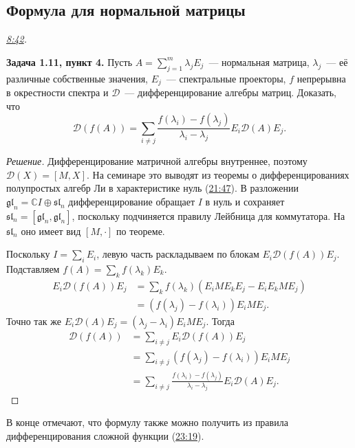 \documentclass[11pt,a4paper]{article}
\theoremstyle{plain}
\theoremstyle{definition}
\newcommand{\CC}{\mathbb C}
\newcommand{\id}{I}
\newcommand{\at}[3]{\href{https://www.youtube.com/watch?v=#1&t=#2s}{#3}}
\newcommand{\topic}[2]{\Needspace{5\baselineskip}\subsection*{#1}\noindent\emph{#2.}\par\nobreak\smallskip}
\begin{document}
\topic{Формула для нормальной матрицы}{\at{RgVedijsA-I}{522}{8:42}}
\noindent\textbf{Задача 1.11, пункт 4.}
Пусть $A=\sum_{j=1}^m\lambda_jE_j$~--- нормальная матрица,
$\lambda_j$~--- её различные собственные значения, $E_j$~---
спектральные проекторы, $f$ непрерывна в окрестности спектра и
$\mathcal D$~--- дифференцирование алгебры матриц. Доказать, что
\[
 \mathcal D(f(A))=\sum_{i\ne j}
   \frac{f(\lambda_i)-f(\lambda_j)}{\lambda_i-\lambda_j}
   E_i\mathcal D(A)E_j .
\]
\begin{proof}[Решение]
Дифференцирование матричной алгебры внутреннее, поэтому
$\mathcal D(X)=[M,X]$. На семинаре это выводят из теоремы
о дифференцированиях полупростых алгебр Ли в характеристике нуль
(\at{RgVedijsA-I}{1307}{21:47}). В разложении
$\mathfrak{gl}_n=\CC\id\oplus\mathfrak{sl}_n$ дифференцирование
обращает $\id$ в нуль и сохраняет
$\mathfrak{sl}_n=[\mathfrak{gl}_n,\mathfrak{gl}_n]$, поскольку
подчиняется правилу Лейбница для коммутатора.
На $\mathfrak{sl}_n$ оно имеет вид $[M,\cdot]$ по теореме.

Поскольку $\id=\sum_iE_i$, левую часть раскладываем по блокам
$E_i\mathcal D(f(A))E_j$. Подставляем $f(A)=\sum_k f(\lambda_k)E_k$.
\[
 \begin{aligned}
 E_i\mathcal D(f(A))E_j
 &=\sum_k f(\lambda_k)(E_iME_kE_j-E_iE_kME_j)\\
 &=(f(\lambda_j)-f(\lambda_i))E_iME_j.
 \end{aligned}
\]
Точно так же $E_i\mathcal D(A)E_j=(\lambda_j-\lambda_i)E_iME_j$.
Тогда \[
\begin{aligned}
\mathcal D(f(A))&=\sum_{i\ne j}E_i\mathcal D(f(A))E_j\\&=\sum_{i\ne j}(f(\lambda_j)-f(\lambda_i))E_iME_j\\&=\sum_{i\ne j}
   \frac{f(\lambda_i)-f(\lambda_j)}{\lambda_i-\lambda_j}
   E_i\mathcal D(A)E_j.
\end{aligned}
\]
\end{proof}
В конце отмечают, что формулу также можно получить из правила
дифференцирования сложной функции (\at{RgVedijsA-I}{1399}{23:19}).
\end{document}
